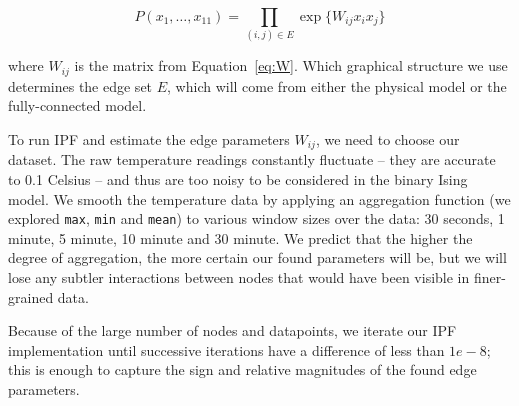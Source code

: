 \begin{equation}
P(x_1,\ldots,x_{11}) = \prod_{(i,j) \in E} \exp\lbrace W_{ij}x_ix_j\rbrace
\end{equation}

where $W_{ij}$ is the matrix from Equation~\ref{eq:W}.
Which graphical structure we use determines the edge set $E$, which will come from either the physical model or the fully-connected model.

To run IPF and estimate the edge parameters $W_{ij}$, we need to choose our dataset.
The raw temperature readings constantly fluctuate -- they are accurate to 0.1 Celsius -- and thus are too noisy to be considered in the binary Ising model.
We smooth the temperature data by applying an aggregation function (we explored \texttt{max}, \texttt{min} and \texttt{mean}) to various window sizes over the data: 30 seconds, 1 minute, 5 minute, 10 minute and 30 minute.
We predict that the higher the degree of aggregation, the more certain our found parameters will be, but we will lose any subtler interactions between nodes that would have been visible in finer-grained data.

Because of the large number of nodes and datapoints, we iterate our IPF implementation until successive iterations have a difference of less than $1e-8$; this is enough to capture the sign and relative magnitudes of the found edge parameters.
